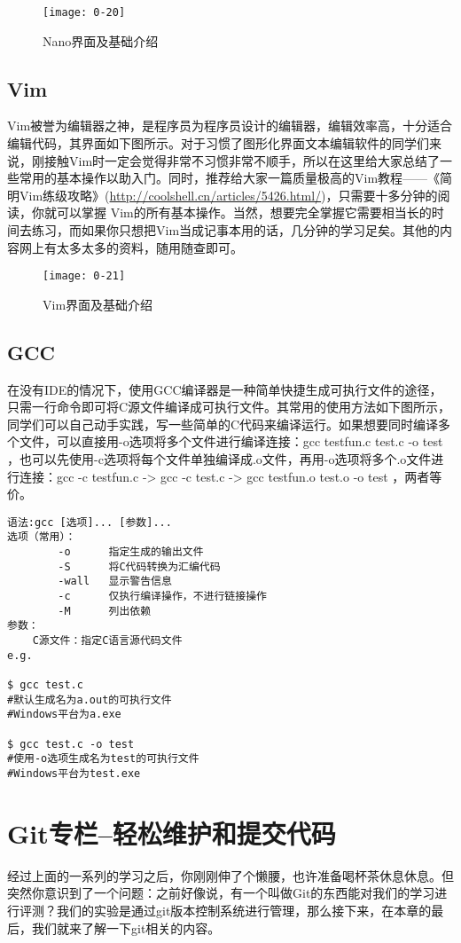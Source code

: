 \begin{figure}[htbp]
  \centering
  \texttt{[image: 0-20]}
  \caption{Nano界面及基础介绍}\label{fig:0-20}
\end{figure}

\subsection{Vim}
Vim被誉为编辑器之神，是程序员为程序员设计的编辑器，编辑效率高，十分适合编辑代码，其界面如下图所示。对于习惯了图形化界面文本编辑软件的同学们来说，刚接触Vim时一定会觉得非常不习惯非常不顺手，所以在这里给大家总结了一些常用的基本操作以助入门。同时，推荐给大家一篇质量极高的Vim教程——《简明Vim练级攻略》(\url{http://coolshell.cn/articles/5426.html/})，只需要十多分钟的阅读，你就可以掌握 Vim的所有基本操作。当然，想要完全掌握它需要相当长的时间去练习，而如果你只想把Vim当成记事本用的话，几分钟的学习足矣。其他的内容网上有太多太多的资料，随用随查即可。

\begin{figure}[htbp]
  \centering
  \texttt{[image: 0-21]}
  \caption{Vim界面及基础介绍}\label{fig:0-21}
\end{figure}

\subsection{GCC}
在没有IDE的情况下，使用GCC编译器是一种简单快捷生成可执行文件的途径，只需一行命令即可将C源文件编译成可执行文件。其常用的使用方法如下图所示，同学们可以自己动手实践，写一些简单的C代码来编译运行。如果想要同时编译多个文件，可以直接用-o选项将多个文件进行编译连接：gcc testfun.c test.c -o test ，也可以先使用-c选项将每个文件单独编译成.o文件，再用-o选项将多个.o文件进行连接：gcc -c testfun.c -> gcc -c test.c -> gcc testfun.o test.o -o test ，两者等价。

\begin{verbatim}
语法:gcc [选项]... [参数]...
选项（常用）：
		-o		指定生成的输出文件
		-S		将C代码转换为汇编代码
		-wall	显示警告信息
		-c		仅执行编译操作，不进行链接操作
		-M		列出依赖
参数：
	C源文件：指定C语言源代码文件
e.g.

$ gcc test.c
#默认生成名为a.out的可执行文件
#Windows平台为a.exe

$ gcc test.c -o test
#使用-o选项生成名为test的可执行文件
#Windows平台为test.exe
\end{verbatim}

\section{Git专栏--轻松维护和提交代码}
经过上面的一系列的学习之后，你刚刚伸了个懒腰，也许准备喝杯茶休息休息。但突然你意识到了一个问题：之前好像说，有一个叫做Git的东西能对我们的学习进行评测？我们的实验是通过git版本控制系统进行管理，那么接下来，在本章的最后，我们就来了解一下git相关的内容。
